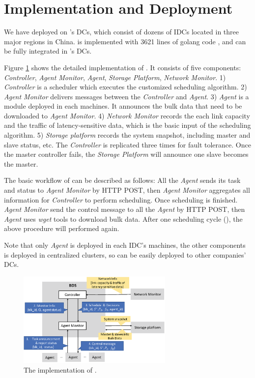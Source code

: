\section{Implementation and Deployment}
We have deployed \name on \company's DCs, which consist of dozens of IDCs located in three major regions in China. \name is implemented with 3621 lines of golang code \cite{golang}, and can be fully integrated in \company's DCs.

Figure \ref{fig:implementation} shows the detailed implementation of \name. It  consists of five components: \emph{Controller}, \emph{Agent Monitor}, \emph{Agent}, \emph{Storage Platform}, \emph{Network Monitor}. 1) \emph{Controller} is a scheduler which executes the customized scheduling algorithm. 2) \emph{Agent Monitor} delivers messages between the \emph{Controller} and \emph{Agent}. 3) \emph{Agent} is a module deployed in each machines. It announces the bulk data that need to be downloaded to \emph{Agent Monitor}. 4) \emph{Network Monitor} records the each link capacity and the traffic of latency-sensitive data, which is the basic input of the scheduling algorithm. 5) \emph{Storage platform} records the system snapshot, including master and slave status, etc. The \emph{Controller} is replicated three times for fault tolerance. Once the master controller fails, the \emph{Storage Platform} will announce one slave becomes the master.

The basic workflow of \name can be described as follows: All the \emph{Agent} sends its task and status to \emph{Agent Monitor} by HTTP POST, then \emph{Agent Monitor} aggregates all information for \emph{Controller} to perform scheduling. Once scheduling is finished. \emph{Agent Monitor} send the control message to all the \emph{Agent} by HTTP POST, then \emph{Agent} uses \emph{wget} tools to download bulk data. After one scheduling cycle (\fillme), the above procedure will performed again.

Note that only \emph{Agent} is deployed in each IDC's machines, the other components is deployed in centralized clusters, so \name can be easily deployed to other companies' DCs.
	
\begin{figure}[htbp]
  \centering
  \includegraphics[width=3in]{images/implementation.eps}
  \caption{The implementation of \name.}
  \label{fig:implementation}
\end{figure}
\vspace{-15pt}

